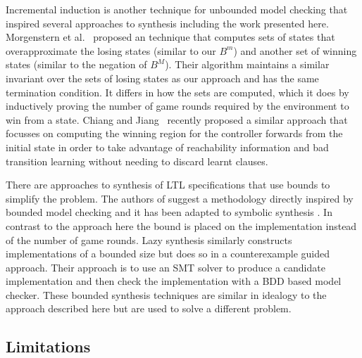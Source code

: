 Incremental induction \cite{Bradley11} is another technique for unbounded
model checking that inspired several approaches to synthesis including the work
presented here.  Morgenstern et al.~\cite{Morgenstern13} proposed an
technique that computes sets of states that overapproximate the losing states
(similar to our $B^m$) and another set of winning states (similar to the
negation of $B^M$).  Their algorithm maintains a similar invariant over the
sets of losing states as our approach and has the same termination condition.
It differs in how the sets are computed, which it does by inductively proving
the number of game rounds required by the environment to win from a state.
Chiang and Jiang~\cite{Chiang15} recently proposed a similar approach that
focusses on computing the winning region for the controller forwards from the
initial state in order to take advantage of reachability information and bad
transition learning without needing to discard learnt clauses.

There are approaches to synthesis of LTL specifications that use bounds to simplify the problem.  The authors of \cite{Finkbeiner13} suggest a methodology directly inspired by bounded model checking and it has been adapted to symbolic synthesis \cite{Ehlers12}. In contrast to the approach here the bound is placed on the implementation instead of the number of game rounds.  Lazy synthesis \cite{Finkbeiner12} similarly constructs implementations of a bounded size but does so in a counterexample guided approach. Their approach is to use an SMT solver to produce a candidate implementation and then check the implementation with a BDD based model checker. These bounded synthesis techniques are similar in idealogy to the approach described here but are used to solve a different problem.


\subsection{Limitations}

